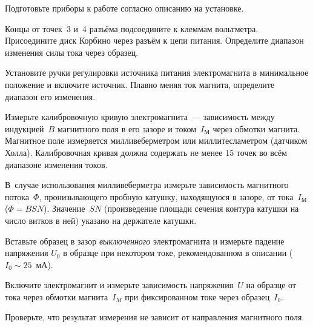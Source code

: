 \begin{lab:task}


\item Подготовьте приборы к работе согласно описанию на установке.

\item Концы от точек~3 и~4 разъёма подсоедините к клеммам вольтметра.
Присоедините диск Корбино через разъём к цепи питания. Определите
диапазон изменения силы тока через образец.

\item Установите ручки регулировки источника питания электромагнита 
в минимальное положение и включите источник. 
Плавно меняя ток магнита, определите диапазон его изменения.

\item Измерьте калибровочную кривую электромагнита~---
зависимость между индукцией~$B$ магнитного поля в его зазоре и 
током~$I_{М}$ через обмотки магнита.
Магнитное поле измеряется милливеберметром или миллитесламетром
(датчиком Холла). Калибровочная кривая должна содержать не менее
15 точек во всём диапазоне изменения токов.

В~случае использования милливеберметра измерьте зависимость 
магнитного потока~$\Phi$, пронизывающего пробную катушку, 
находящуюся в зазоре, от тока~$I_{М}$ ($\Phi=BSN$). 
Значение~$SN$ (произведение площади сечения контура катушки на
число витков в ней) указано на держателе катушки.

\item \label{p1} Вставьте образец в зазор \emph{выключенного} электромагнита 
и измерьте падение напряжения $U_0$ в образце при некотором токе,
рекомендованном в описании ($I_0\sim 25$~мА). 

\item \label{p2} Включите электромагнит и измерьте зависимость напряжения~$U$ 
на образце от тока через обмотки магнита~$I_M$ при фиксированном токе
через образец~$I_0$.

\item Проверьте, что результат измерения не зависит от направления магнитного
поля.



\end{lab:task}
